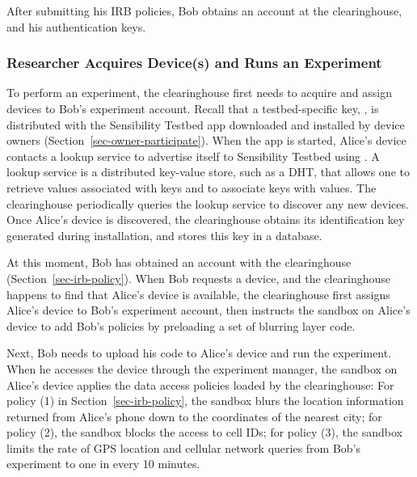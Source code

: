 After submitting his IRB policies, Bob obtains an account at the
clearinghouse, and his authentication keys. 

\subsubsection{Researcher Acquires Device(s) and Runs an
Experiment}\label{sec-acquire-run}

To perform an experiment, the clearinghouse first needs to 
acquire and assign devices to Bob's experiment account. 
Recall that a testbed-specific key, , is distributed
with the Sensibility Testbed app downloaded and installed by device
owners (Section~\ref{sec-owner-participate}). When the app is started, 
Alice's device contacts a lookup service to advertise itself to Sensibility 
Testbed using . A lookup service is a distributed
key-value store, such as a DHT, that allows one to retrieve values 
associated with keys and to associate keys with values. 
The clearinghouse periodically queries the lookup service to
discover any new devices. Once Alice's device is discovered, the
clearinghouse obtains its identification key  generated
during installation, and stores this key in a database. 

At this moment,  Bob has obtained an account with the clearinghouse 
(Section~\ref{sec-irb-policy}).
When Bob requests a device, and the clearinghouse
happens to find that Alice's device is available, the
clearinghouse first 
assigns Alice's device to Bob's experiment account, then instructs 
the sandbox on Alice's device to add Bob's policies by preloading
a set of blurring layer code.

Next, Bob needs to upload his code to Alice's device and 
run the experiment. When he accesses the device through
the experiment manager, the sandbox on Alice's device 
applies the data access policies loaded by the clearinghouse: For policy (1) in
Section~\ref{sec-irb-policy}, the sandbox blurs the location
information returned from Alice's phone down to the coordinates
of the nearest city; for policy (2), the sandbox blocks the
access to cell IDs; for policy (3), the sandbox limits the rate
of GPS location and cellular network queries from Bob's
experiment to one in every 10 minutes.

